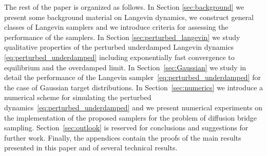 The rest of the paper is organized as follows.  In Section \ref{sec:background} we present some background material on Langevin dynamics, we construct general classes of Langevin samplers and we introduce criteria for assessing the performance of the samplers.  In Section \ref{sec:perturbed_langevin} we study qualitative properties of the perturbed underdamped Langevin dynamics \eqref{eq:perturbed_underdamped} including exponentially fast convergence to equilibrium and the overdamped limit. In Section~\ref{sec:Gaussian} we study in detail the performance of the Langevin sampler~\eqref{eq:perturbed_underdamped} for the case of Gaussian target distributions. In Section~\ref{sec:numerics} we introduce a numerical scheme for simulating the perturbed dynamics~\eqref{eq:perturbed_underdamped} and we present numerical experiments on the implementation of the proposed samplers for the problem of diffusion bridge sampling. Section~\ref{sec:outlook} is reserved for conclusions and suggestions for further work. Finally, the appendices contain the proofs of the main results presented in this paper and of several technical results.

















